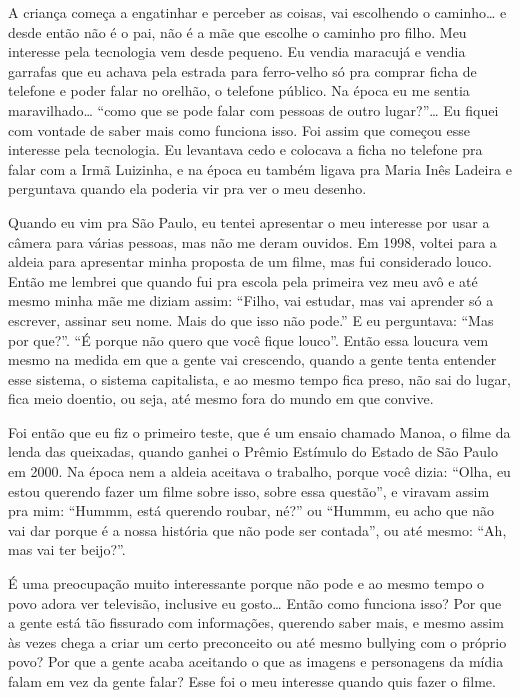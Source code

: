 A criança começa a engatinhar e perceber as coisas, vai escolhendo o
caminho\ldots{} e desde então não é o pai, não é a mãe que escolhe o caminho
pro filho. Meu interesse pela tecnologia vem desde pequeno. Eu vendia
maracujá e vendia garrafas que eu achava pela estrada para ferro-velho
só pra comprar ficha de telefone e poder falar no orelhão, o telefone
público. Na época eu me sentia maravilhado\ldots{} ``como que se pode falar
com pessoas de outro lugar?''\ldots{} Eu fiquei com vontade de saber mais
como funciona isso. Foi assim que começou esse interesse pela
tecnologia. Eu levantava cedo e colocava a ficha no telefone pra falar
com a Irmã Luizinha, e na época eu também ligava pra Maria Inês Ladeira
e perguntava quando ela poderia vir pra ver o meu desenho. 

Quando eu vim pra São Paulo, eu tentei apresentar o meu interesse por
usar a câmera para várias pessoas, mas não me deram ouvidos. Em 1998,
voltei para a aldeia para apresentar minha proposta de um filme, mas
fui considerado louco. Então me lembrei que quando fui pra escola pela
primeira vez meu avô e até mesmo minha mãe me diziam assim: ``Filho, vai
estudar, mas vai aprender só a escrever, assinar seu nome. Mais do que
isso não pode.'' E eu perguntava: ``Mas por que?''. ``É porque não quero
que você fique louco''. Então essa loucura vem mesmo na medida em que a
gente vai crescendo, quando a gente tenta entender esse sistema, o
sistema capitalista, e ao mesmo tempo fica preso, não sai do lugar,
fica meio doentio, ou seja, até mesmo fora do mundo em que convive. 

Foi então que eu fiz o primeiro teste, que é um ensaio chamado Manoa, o
filme da lenda das queixadas, quando ganhei o Prêmio Estímulo do Estado
de São Paulo em 2000. Na época nem a aldeia aceitava o trabalho, porque
você dizia: ``Olha, eu estou querendo fazer um filme sobre isso, sobre
essa questão'', e viravam assim pra mim: ``Hummm, está querendo roubar,
né?'' ou ``Hummm, eu acho que não vai dar porque é a nossa história que
não pode ser contada'', ou até mesmo: ``Ah, mas vai ter beijo?''.

É uma preocupação muito interessante porque não pode e ao mesmo tempo o
povo adora ver televisão, inclusive eu gosto\ldots{} Então como funciona
isso? Por que a gente está tão fissurado com informações, querendo
saber mais, e mesmo assim às vezes chega a criar um certo preconceito
ou até mesmo bullying com o próprio povo? Por que a gente acaba
aceitando o que as imagens e personagens da mídia falam em vez da gente
falar? Esse foi o meu interesse quando quis fazer o filme. 

